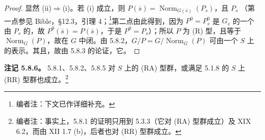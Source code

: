 \begin{proof}
显然 (ii)$\Rightarrow$(i)。若 (i) 成立，则 $P(\overline s)=\operatorname{Norm}_{G(\overline s)}(P_s)$，且 $P_s$ （第一点参见 Bible，\S 12.3，引理 4；\footnote{编者注：下文已作详细补充。}第二点由此得到，因为 $P^0=P_s^0$ 是 $G_s$ 的一个由 $P_s$ 的，故 $P^0(\overline s)=P(\overline s)$，于是 $P^0=P_s$）；所以 $P$ 为 (R) 型，且等于 $\operatorname{Norm}_G(P)$，故在 $G$ 中闭。由 5.8.2，$G/P=G/\operatorname{Norm}_G(P)$ 可由一个 $S$ 上的表示。其且，故由 5.8.3 的论证，它。
\end{proof}
\textbf{注记 5.8.6。} 5.8.1、5.8.2、5.8.5 对 $S$ 上的 (RA) 型群，或满足 5.1.8 的 $S$ 上 (RR) 型群也成立。\footnote{编者注：事实上，5.8.1 的证明只用到 5.3.3（它对 (RA) 型群成立）及 XIX 6.2，而由 XII 1.7 (b)，后者也对 (RR) 型群成立。}

